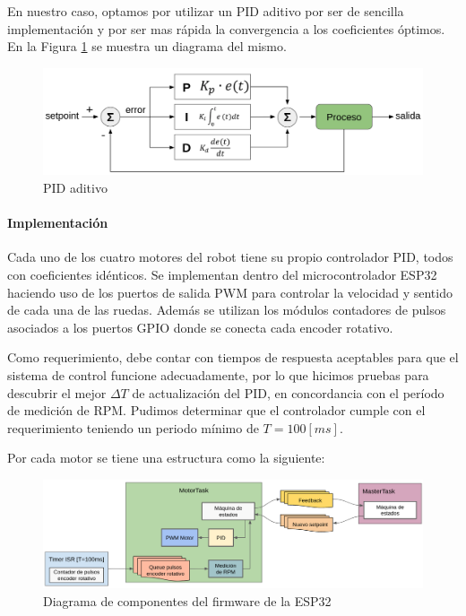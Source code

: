 En nuestro caso, optamos por utilizar un PID aditivo por ser de sencilla implementación y por ser mas rápida la convergencia a los coeficientes óptimos. En la Figura \ref{fig:pidaditivo} se muestra un diagrama del mismo.

\begin{figure}[H]
    \centering
    \includegraphics[width=1.0\linewidth]{images/pid_aditivo}
    \caption{PID aditivo}
    \label{fig:pidaditivo}
\end{figure}

\paragraph{Implementación} \mbox{} \vspace{8pt}

Cada uno de los cuatro motores del robot tiene su propio controlador PID, todos con coeficientes idénticos. Se implementan dentro del microcontrolador ESP32 haciendo uso de los puertos de salida PWM para controlar la velocidad y sentido de cada una de las ruedas. Además se utilizan los módulos contadores de pulsos asociados a los puertos GPIO donde se conecta cada encoder rotativo.

Como requerimiento, debe contar con tiempos de respuesta aceptables para que el sistema de control funcione adecuadamente, por lo que hicimos pruebas para descubrir el mejor $\Delta T$ de actualización del PID, en concordancia con el período de medición de RPM. Pudimos determinar que el controlador cumple con el requerimiento teniendo un periodo mínimo de $T=100[ms]$.

Por cada motor se tiene una estructura como la siguiente:

\begin{figure}[H]
    \centering
    \hspace*{-0.75cm}
    \includegraphics[width=1.1\linewidth]{images/diag_comp_esp32_pid_solo.png}
    \caption{Diagrama de componentes del firmware de la ESP32}
    \label{fig:diagcomponentesp32}
\end{figure}

